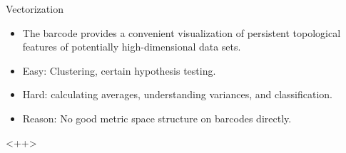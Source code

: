 \documentclass[usenames,dvipsnames,aspectratio=1610]{beamer}
\begin{document}
\begin{frame}{Vectorization}
  \begin{itemize}
    \item The barcode provides a convenient visualization of persistent topological
      features of potentially high-dimensional data sets.
    \item {\color{blue} Easy:} Clustering, certain hypothesis testing.
    \item {\color{red} Hard:} calculating averages, understanding variances, and classification.
    \item {\color{green} Reason:} No good metric space structure on barcodes directly.
  \end{itemize}<++>
\end{frame}
\end{document}
